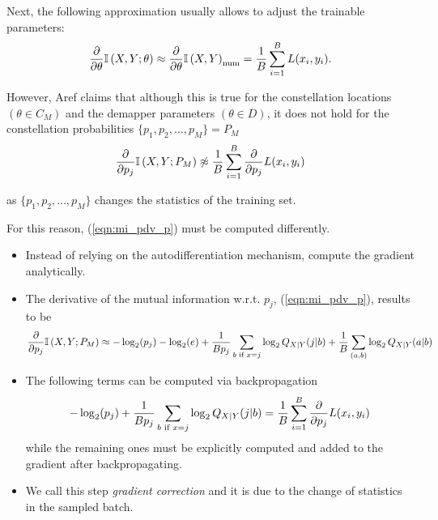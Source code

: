 \documentclass[english,aspectratio=1610,9pt,helvet,nicetitles]{ICEbeamerTUMCD}
\begin{document}
\begin{frame}
	Next, the following approximation usually allows to adjust the trainable parameters:
	\begin{align}
		\pdv{\theta} \mathbb{I} \left(X , Y ; \theta \right) \approx \pdv{\theta} \mathbb{I} \left(X , Y\right)_{\text{num}} = \dfrac{1}{B} \sum \limits_{i = 1}^{B} L(x_i, y_i).
	\end{align}
	
	However, Aref claims that although this is true for the constellation locations $(\theta \in C_M)$ and the demapper parameters $(\theta \in D)$, it does not hold for the constellation probabilities $\{p_1, p_2, \dots, p_M\} = P_M$
	\begin{align}
	\label{eqn:mi_pdv_p}
		\pdv{p_j} \mathbb{I} \left(X , Y ; P_M \right) \not\approx \dfrac{1}{B} \sum \limits_{i = 1}^{B} \pdv{p_j} L(x_i, y_i)
	\end{align}
	
	as $\{p_1, p_2, \dots, p_M\}$ changes the statistics of the training set.
	
	For this reason, (\ref{eqn:mi_pdv_p}) must be computed differently.
	
	\end{frame}

\begin{frame}
\begin{itemize}
	\item Instead of relying on the autodifferentiation mechanism, \citeauthor{Aref} compute the gradient analytically.\\
 	\item The derivative of the mutual information w.r.t. $p_j$, (\ref{eqn:mi_pdv_p}), results to be
	\begin{align}
		\pdv{p_j} \mathbb{I} \left(X , Y ; P_M \right) \approx - \log_2 (p_j) - \log_2 (e) + \dfrac{1}{Bp_j}\sum \limits_{b \text{ if } x=j} \log_2 Q_{X|Y}(j|b) + \dfrac{1}{B} \sum \limits_{(a,b)} \log_2 Q_{X|Y}(a|b)
	\end{align}
	
	\item The following terms can be computed via backpropagation
	\begin{align}
		- \log_2 (p_j) + \dfrac{1}{Bp_j}\sum \limits_{b \text{ if } x=j} \log_2 Q_{X|Y}(j|b) = \dfrac{1}{B} \sum \limits_{i = 1}^{B} \pdv{p_j} L(x_i, y_i)
	\end{align}
	while the remaining ones must be explicitly computed and added to the gradient after backpropagating.
	\item We call this step \textit{gradient correction} and it is due to the change of statistics in the sampled batch.
\end{itemize}
\end{frame}
	
\end{document}
